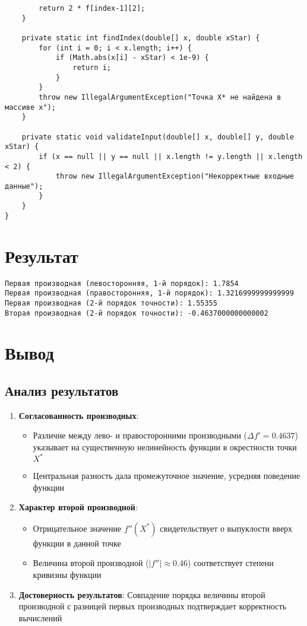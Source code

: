 \begin{verbatim}
        return 2 * f[index-1][2];
    }

    private static int findIndex(double[] x, double xStar) {
        for (int i = 0; i < x.length; i++) {
            if (Math.abs(x[i] - xStar) < 1e-9) {
                return i;
            }
        }
        throw new IllegalArgumentException("Точка X* не найдена в массиве x");
    }

    private static void validateInput(double[] x, double[] y, double xStar) {
        if (x == null || y == null || x.length != y.length || x.length < 2) {
            throw new IllegalArgumentException("Некорректные входные данные");
        }
    }
}
\end{verbatim}

\section*{Результат}

\begin{verbatim}
Первая производная (левосторонняя, 1-й порядок): 1.7854
Первая производная (правосторонняя, 1-й порядок): 1.3216999999999999
Первая производная (2-й порядок точности): 1.55355
Вторая производная (2-й порядок точности): -0.4637000000000002
\end{verbatim}

\section*{Вывод}

\subsection*{Анализ результатов}
\begin{enumerate}
\item \textbf{Согласованность производных}:
\begin{itemize}
\item Различие между лево- и правосторонними производными ($\Delta f' = 0.4637$) указывает на существенную нелинейность функции в окрестности точки $X^*$
\item Центральная разность дала промежуточное значение, усредняя поведение функции
\end{itemize}

\item \textbf{Характер второй производной}:
\begin{itemize}
\item Отрицательное значение $f''(X^*)$ свидетельствует о выпуклости вверх функции в данной точке
\item Величина второй производной ($|f''| \approx 0.46$) соответствует степени кривизны функции
\end{itemize}

\item \textbf{Достоверность результатов}:
Совпадение порядка величины второй производной с разницей первых производных подтверждает корректность вычислений
\end{enumerate}

\pagebreak
